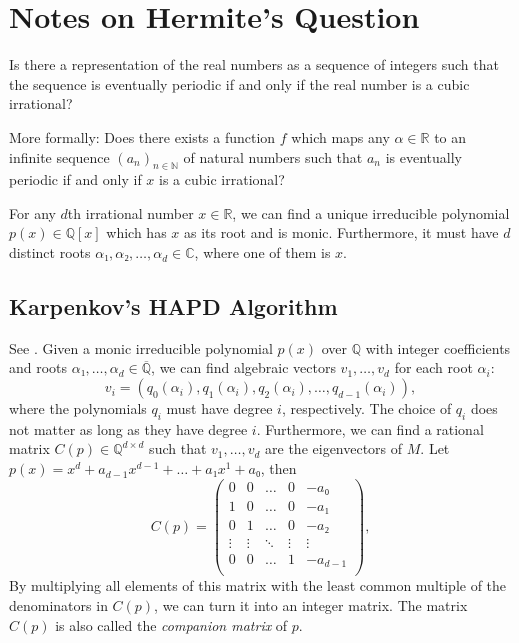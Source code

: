 \documentclass[english,version-2020-11]{uzl-thesis}
\begin{document}

\chapter{Notes on Hermite's Question}


\begin{problem}
  Is there a representation of the real numbers as a sequence of integers such
  that the sequence is eventually periodic if and only if the real number is a
  cubic irrational?
\end{problem}

More formally: Does there exists a function $f$ which maps any $α ∈ ℝ$ to an
infinite sequence $(a_n)_{n ∈ ℕ}$ of natural numbers such that $a_n$ is
eventually periodic if and only if $x$ is a cubic irrational?

For any $d$th irrational number $x ∈ ℝ$, we can find a unique irreducible polynomial $p(x) ∈ ℚ[x]$
which has $x$ as its root and is monic.
Furthermore, it must have $d$ distinct roots $α₁, α₂, \dots, α_d ∈ ℂ$,
where one of them is $x$.

\section{Karpenkov's HAPD Algorithm}

See \cite{Karpenkov2024}.
Given a monic irreducible polynomial $p(x)$ over $ℚ$ with integer coefficients and roots $α₁, \dots, α_d ∈ \overline{ℚ}$,
we can find algebraic vectors $v_1, \dots, v_d$ for each root $α_i$:
\[
  v_i = (q_0(α_i), q_1(α_i), q_2(α_i), \dots, q_{d-1}(α_i)),
\]
where the polynomials $q_i$ must have degree $i$, respectively.
The choice of $q_i$ does not matter as long as they have degree $i$.
Furthermore, we can find a rational matrix $C(p) ∈ ℚ^{d × d}$ such that $v_1, \dots, v_d$ are the eigenvectors of $M$.
Let $p(x) = x^d + a_{d-1} x^{d-1} + \dots + a₁ x^1 + a₀$, then
\[
  C(p) =
  \begin{pmatrix}
    0 & 0 & \dots & 0 & -a₀ \\
    1 & 0 & \dots & 0 & -a₁ \\
    0 & 1 & \dots & 0 & -a₂ \\
    \vdots & \vdots & \ddots & \vdots & \vdots \\
    0 & 0 & \dots & 1 & -a_{d-1} \\
  \end{pmatrix},
\]
By multiplying all elements of this matrix with the least common multiple of the denominators in $C(p)$,
we can turn it into an integer matrix.
The matrix $C(p)$ is also called the \emph{companion matrix} of $p$.
\end{document}
